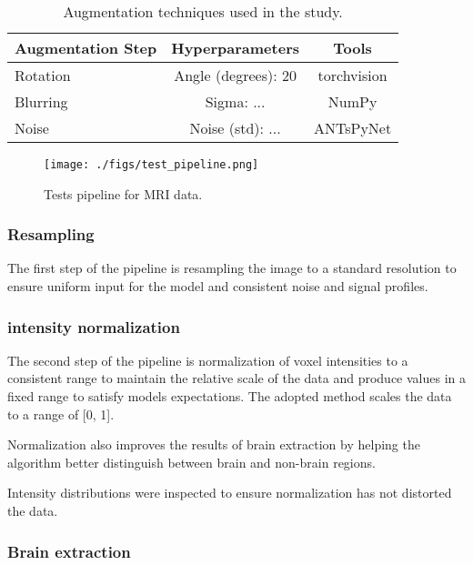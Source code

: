 %
\begin{center}
    \begin{table}
        \centering
        \caption{\label{tab:augmentation_pipeline}Augmentation techniques used in the study.}
        \begin{tabular*}{500pt}{@{\extracolsep\fill}lcc@{\extracolsep\fill}}
            \toprule
            \textbf{Augmentation Step} & \textbf{Hyperparameters} & \textbf{Tools} \\
            \midrule
            Rotation & Angle (degrees): 20 & torchvision \\
            Blurring & Sigma: ...  & NumPy \\
            Noise & Noise (std): ... & ANTsPyNet \\
            \bottomrule
            \end{tabular*}
    \end{table}
\end{center}
%
\begin{figure}[h]
    \centering
    \texttt{[image: ./figs/test\_pipeline.png]}
    \caption{Tests pipeline for MRI data.}\label{fig:test_pipeline}
\end{figure}

\subsubsection{Resampling}

The first step of the pipeline is resampling the image to a standard resolution to ensure uniform input for the model and consistent noise and signal profiles.

\subsubsection{intensity normalization}

The second step of the pipeline is normalization of voxel intensities to a consistent range to maintain the relative scale of the data and produce values in a fixed range to satisfy models expectations. The adopted method scales the data to a range of [0, 1].

Normalization also improves the results of brain extraction by helping the algorithm better distinguish between brain and non-brain regions.

Intensity distributions were inspected to ensure normalization has not distorted the data.

\subsubsection{Brain extraction}

